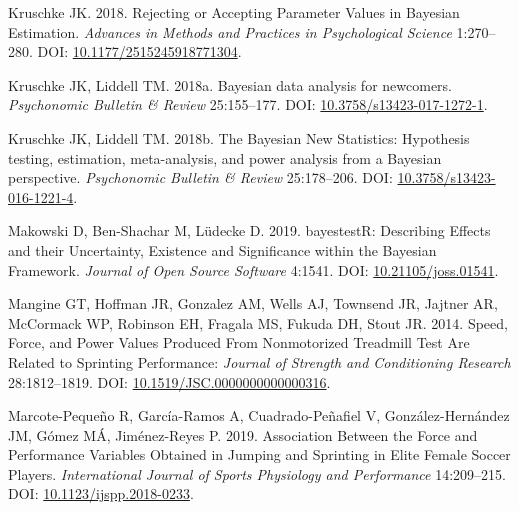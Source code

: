\documentclass[fleqn,10pt]{wlpeerj} %
\newlength{\cslhangindent}
\newlength{\cslentryspacingunit} %
\newenvironment{CSLReferences}[2] %
 {%
  \setlength{\parindent}{0pt}
  \ifodd #1
  \let\oldpar\par
  \def\par{\hangindent=\cslhangindent\oldpar}
  \fi
  \setlength{\parskip}{#2\cslentryspacingunit}
 }%
 {}
\begin{document}
\begin{CSLReferences}{1}{0}
\leavevmode{}%
Kruschke JK. 2018. Rejecting or {Accepting Parameter Values} in {Bayesian Estimation}. \emph{Advances in Methods and Practices in Psychological Science} 1:270--280. DOI: \href{https://doi.org/10.1177/2515245918771304}{10.1177/2515245918771304}.

\leavevmode{}%
Kruschke JK, Liddell TM. 2018a. Bayesian data analysis for newcomers. \emph{Psychonomic Bulletin \& Review} 25:155--177. DOI: \href{https://doi.org/10.3758/s13423-017-1272-1}{10.3758/s13423-017-1272-1}.

\leavevmode{}%
Kruschke JK, Liddell TM. 2018b. The {Bayesian New Statistics}: {Hypothesis} testing, estimation, meta-analysis, and power analysis from a {Bayesian} perspective. \emph{Psychonomic Bulletin \& Review} 25:178--206. DOI: \href{https://doi.org/10.3758/s13423-016-1221-4}{10.3758/s13423-016-1221-4}.

\leavevmode{}%
Makowski D, Ben-Shachar M, Lüdecke D. 2019. {bayestestR}: {Describing Effects} and their {Uncertainty}, {Existence} and {Significance} within the {Bayesian Framework}. \emph{Journal of Open Source Software} 4:1541. DOI: \href{https://doi.org/10.21105/joss.01541}{10.21105/joss.01541}.

\leavevmode{}%
Mangine GT, Hoffman JR, Gonzalez AM, Wells AJ, Townsend JR, Jajtner AR, McCormack WP, Robinson EH, Fragala MS, Fukuda DH, Stout JR. 2014. Speed, {Force}, and {Power Values Produced From Nonmotorized Treadmill Test Are Related} to {Sprinting Performance}: \emph{Journal of Strength and Conditioning Research} 28:1812--1819. DOI: \href{https://doi.org/10.1519/JSC.0000000000000316}{10.1519/JSC.0000000000000316}.

\leavevmode{}%
Marcote-Pequeño R, García-Ramos A, Cuadrado-Peñafiel V, González-Hernández JM, Gómez MÁ, Jiménez-Reyes P. 2019. Association {Between} the {Force} and {Performance Variables Obtained} in {Jumping} and {Sprinting} in {Elite Female Soccer Players}. \emph{International Journal of Sports Physiology and Performance} 14:209--215. DOI: \href{https://doi.org/10.1123/ijspp.2018-0233}{10.1123/ijspp.2018-0233}.


\end{CSLReferences}
\end{document}

